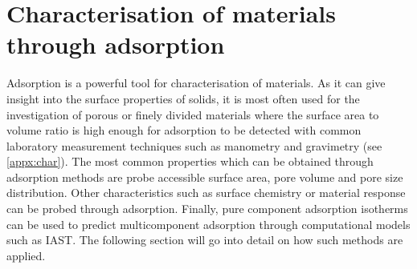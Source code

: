
\section{Characterisation of materials through adsorption}

Adsorption is a powerful tool for characterisation of materials.
As it can give insight into the surface properties of solids, it
is most often used for the investigation of porous or finely
divided materials where the surface area to volume ratio is
high enough for adsorption to be detected with common laboratory
measurement techniques such as manometry and gravimetry (see
\autoref{appx:char}). The most common properties which can
be obtained through adsorption methods are probe accessible
surface area, pore volume and pore size distribution. Other
characteristics such as surface chemistry or material response
can be probed through adsorption. Finally, pure component adsorption
isotherms can be used to predict multicomponent adsorption through
computational models such as \gls{IAST}. The following section will go into
detail on how such methods are applied.



